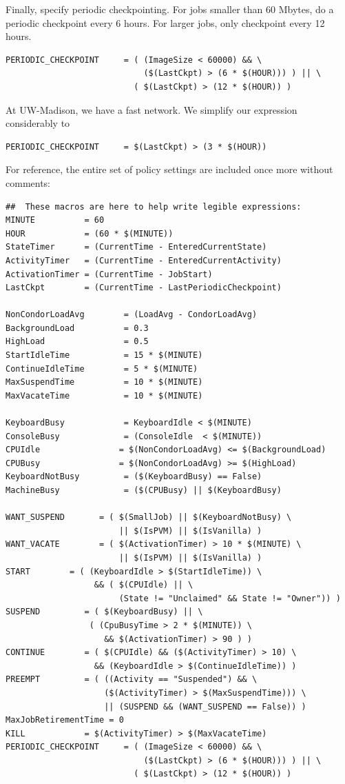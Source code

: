Finally, specify periodic checkpointing.  
For jobs smaller than 60 Mbytes, do a periodic checkpoint every 6 hours.  
For larger jobs, only checkpoint every 12 hours.
\begin{verbatim}
PERIODIC_CHECKPOINT     = ( (ImageSize < 60000) && \
                            ($(LastCkpt) > (6 * $(HOUR))) ) || \ 
                          ( $(LastCkpt) > (12 * $(HOUR)) )
\end{verbatim}


At UW-Madison, we have a fast network.
We simplify our expression considerably to
\begin{verbatim}
PERIODIC_CHECKPOINT     = $(LastCkpt) > (3 * $(HOUR))
\end{verbatim}

For reference, the entire set of policy settings are included
once more without comments:

\begin{verbatim}
##  These macros are here to help write legible expressions:
MINUTE          = 60
HOUR            = (60 * $(MINUTE))
StateTimer      = (CurrentTime - EnteredCurrentState)
ActivityTimer   = (CurrentTime - EnteredCurrentActivity)
ActivationTimer = (CurrentTime - JobStart)
LastCkpt        = (CurrentTime - LastPeriodicCheckpoint)

NonCondorLoadAvg        = (LoadAvg - CondorLoadAvg)
BackgroundLoad          = 0.3
HighLoad                = 0.5
StartIdleTime           = 15 * $(MINUTE)
ContinueIdleTime        = 5 * $(MINUTE)
MaxSuspendTime          = 10 * $(MINUTE)
MaxVacateTime           = 10 * $(MINUTE)

KeyboardBusy            = KeyboardIdle < $(MINUTE)
ConsoleBusy             = (ConsoleIdle  < $(MINUTE))
CPUIdle                = $(NonCondorLoadAvg) <= $(BackgroundLoad)
CPUBusy                = $(NonCondorLoadAvg) >= $(HighLoad)
KeyboardNotBusy         = ($(KeyboardBusy) == False)
MachineBusy             = ($(CPUBusy) || $(KeyboardBusy)

WANT_SUSPEND       = ( $(SmallJob) || $(KeyboardNotBusy) \
                       || $(IsPVM) || $(IsVanilla) )
WANT_VACATE        = ( $(ActivationTimer) > 10 * $(MINUTE) \
                       || $(IsPVM) || $(IsVanilla) )
START        = ( (KeyboardIdle > $(StartIdleTime)) \
                  && ( $(CPUIdle) || \
                       (State != "Unclaimed" && State != "Owner")) )
SUSPEND         = ( $(KeyboardBusy) || \
                 ( (CpuBusyTime > 2 * $(MINUTE)) \
                    && $(ActivationTimer) > 90 ) )
CONTINUE        = ( $(CPUIdle) && ($(ActivityTimer) > 10) \
                  && (KeyboardIdle > $(ContinueIdleTime)) )
PREEMPT	        = ( ((Activity == "Suspended") && \
                    ($(ActivityTimer) > $(MaxSuspendTime))) \
                    || (SUSPEND && (WANT_SUSPEND == False)) )
MaxJobRetirementTime = 0
KILL            = $(ActivityTimer) > $(MaxVacateTime)
PERIODIC_CHECKPOINT     = ( (ImageSize < 60000) && \
                            ($(LastCkpt) > (6 * $(HOUR))) ) || \ 
                          ( $(LastCkpt) > (12 * $(HOUR)) )
\end{verbatim}

